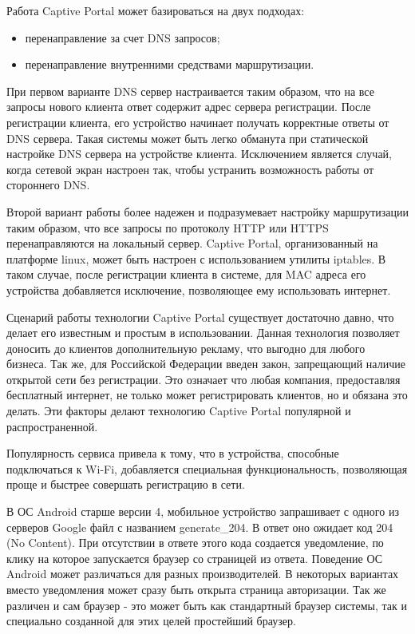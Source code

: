 Работа Captive Portal может базироваться на двух подходах:

\begin{itemize}
	\item перенаправление за счет DNS запросов;
	\item перенаправление внутренними средствами маршрутизации.
\end{itemize}

При первом варианте DNS сервер настраивается таким образом, что на все запросы нового клиента ответ содержит адрес сервера регистрации. После регистрации клиента, его устройство начинает получать корректные ответы от DNS сервера. Такая системы может быть легко обманута при статической настройке DNS сервера на устройстве клиента. Исключением является случай, когда сетевой экран настроен так, чтобы устранить возможность работы от стороннего DNS.

Второй вариант работы более надежен и подразумевает настройку маршрутизации таким образом, что все запросы по протоколу HTTP или HTTPS перенаправляются на локальный сервер. Captive Portal, организованный на платформе linux, может быть настроен с использованием утилиты iptables. В таком случае, после регистрации клиента в системе, для MAC адреса его устройства добавляется исключение, позволяющее ему использовать интернет.

Сценарий работы технологии Captive Portal существует достаточно давно, что делает его известным и простым в использовании. Данная технология позволяет доносить до клиентов дополнительную рекламу, что выгодно для любого бизнеса. Так же, для Российской Федерации введен закон, запрещающий наличие открытой сети без регистрации. Это означает что любая компания, предоставляя бесплатный интернет, не только может регистрировать клиентов, но и обязана это делать. Эти факторы делают технологию Captive Portal популярной и распространенной. 

Популярность сервиса привела к тому, что в устройства, способные подключаться к Wi-Fi, добавляется специальная функциональность, позволяющая проще и быстрее совершать регистрацию в сети. 

В ОС Android старше версии 4, мобильное устройство запрашивает с одного из серверов Google файл с названием generate\_204. В ответ оно ожидает код 204 (No Content). При отсутствии в ответе этого кода создается уведомление, по клику на которое запускается браузер со страницей из ответа. Поведение ОС Android может различаться для разных производителей. В некоторых вариантах вместо уведомления может сразу быть открыта страница авторизации. Так же различен и сам браузер - это может быть как стандартный браузер системы, так и специально созданной для этих целей простейший браузер.

